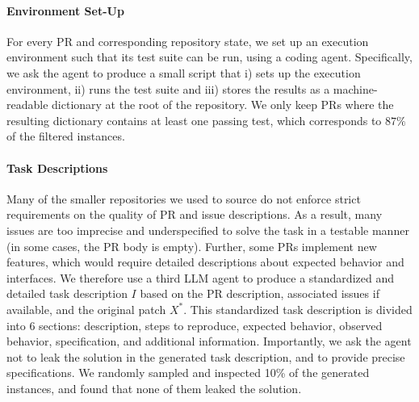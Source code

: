 \paragraph{Environment Set-Up}
For every PR and corresponding repository state, we set up an execution environment such that its test suite can be run, using a coding agent.
Specifically, we ask the agent to produce a small script that i) sets up the execution environment, ii) runs the test suite and iii) stores the results as a machine-readable dictionary at the root of the repository.
We only keep PRs where the resulting dictionary contains at least one passing test, which corresponds to $87\%$ of the filtered instances.

\paragraph{Task Descriptions}
Many of the smaller repositories we used to source \planbench{} do not enforce strict requirements on the quality of PR and issue descriptions. As a result, many issues are too imprecise and underspecified to solve the task in a testable manner (\eg in some cases, the PR body is empty).
Further, some PRs implement new features, which would require detailed descriptions about expected behavior and interfaces.
We therefore use a third LLM agent to produce a standardized and detailed task description $I$ based on the PR description, associated issues if available, and the original patch $X^{*}$.
This standardized task description is divided into 6 sections: description, steps to reproduce, expected behavior, observed behavior, specification, and additional information.
Importantly, we ask the agent not to leak the solution in the generated task description, and to provide precise specifications. 
We randomly sampled and inspected 10\% of the generated instances, and found that none of them leaked the solution.

